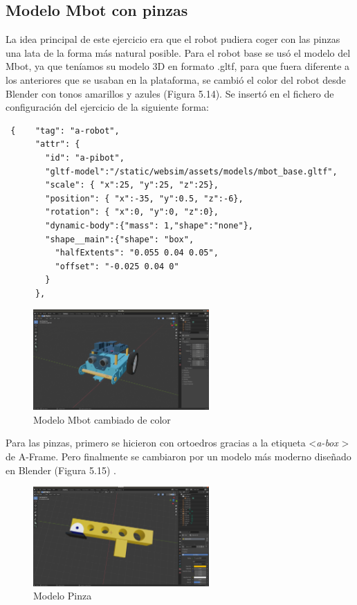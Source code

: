 \subsection{Modelo Mbot con pinzas}
La idea principal de este ejercicio era que el robot pudiera coger con las pinzas una lata de la forma más natural posible.
Para el robot base se usó el modelo del Mbot, ya que teníamos su  modelo 3D en formato .gltf, para que fuera diferente a los anteriores que se usaban en la plataforma, se cambió el color del robot desde Blender con tonos amarillos y azules (Figura 5.14). Se insertó en el fichero de configuración del ejercicio de la siguiente forma:

\begin{lstlisting}
 {    "tag": "a-robot",
      "attr": {
        "id": "a-pibot",
        "gltf-model":"/static/websim/assets/models/mbot_base.gltf",
        "scale": { "x":25, "y":25, "z":25},
        "position": { "x":-35, "y":0.5, "z":-6},
        "rotation": { "x":0, "y":0, "z":0},
        "dynamic-body":{"mass": 1,"shape":"none"},
        "shape__main":{"shape": "box",
          "halfExtents": "0.055 0.04 0.05",
          "offset": "-0.025 0.04 0"
        }
      },
\end{lstlisting}

\begin{figure}[H]
  \centering
  \includegraphics[width=0.6\textwidth]{chapters/images/mbotbase.png}
	\caption{Modelo Mbot cambiado de color}  
\end{figure}


Para las pinzas, primero se hicieron con ortoedros gracias a la etiqueta  \textless \textit{a-box} \textgreater \, de A-Frame. Pero finalmente se cambiaron por un modelo más moderno diseñado en Blender (Figura 5.15) .

\begin{figure}[H]
  \centering
    \includegraphics[width=0.6\textwidth]{chapters/images/pinza.png}
	\caption{Modelo Pinza}    
\end{figure}


